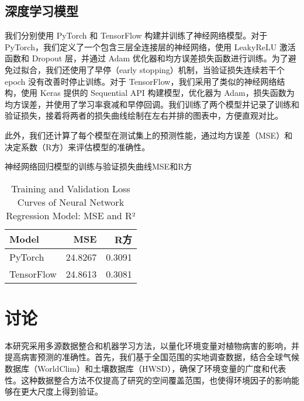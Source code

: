 \documentclass[AutoFakeBold]{LZUThesis-PgD&PhD}
\begin{document}
	\section{深度学习模型}
	我们分别使用 PyTorch 和 TensorFlow 构建并训练了神经网络模型。对于 PyTorch，我们定义了一个包含三层全连接层的神经网络，使用 LeakyReLU 激活函数和 Dropout 层，并通过 Adam 优化器和均方误差损失函数进行训练。为了避免过拟合，我们还使用了早停（early stopping）机制，当验证损失连续若干个 epoch 没有改善时停止训练。对于 TensorFlow，我们采用了类似的神经网络结构，使用 Keras 提供的 Sequential API 构建模型，优化器为 Adam，损失函数为均方误差，并使用了学习率衰减和早停回调。我们训练了两个模型并记录了训练和验证损失，接着将两者的损失曲线绘制在左右并排的图表中，方便直观对比。
	
	此外，我们还计算了每个模型在测试集上的预测性能，通过均方误差（MSE）和决定系数（R方）来评估模型的准确性。
	
	\begin{table}[H]
		\centering
		\caption{神经网络回归模型的训练与验证损失曲线MSE和R方}
		\caption*{Training and Validation Loss Curves of Neural Network Regression Model: MSE and R²}
		
		\begin{tabular}{lrr}
			\toprule
			Model & MSE & R方 \\ 
			\midrule
			PyTorch & 24.8267 & 0.3091 \\
			TensorFlow & 24.8613 & 0.3081 \\
			\bottomrule
		\end{tabular}
		
		\label{tab:model_comparison}
	\end{table}
	
%		
%		
	
	
	
	
	
	
\chapter{讨论}
本研究采用多源数据整合和机器学习方法，以量化环境变量对植物病害的影响，并提高病害预测的准确性。首先，我们基于全国范围的实地调查数据，结合全球气候数据库（WorldClim）和土壤数据库（HWSD），确保了环境变量的广度和代表性。这种数据整合方法不仅提高了研究的空间覆盖范围，也使得环境因子的影响能够在更大尺度上得到验证。
\end{document}
